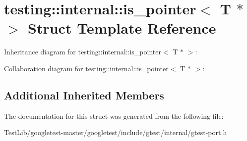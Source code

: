 \hypertarget{structtesting_1_1internal_1_1is__pointer_3_01T_01_5_01_4}{}\section{testing\+:\+:internal\+:\+:is\+\_\+pointer$<$ T $\ast$ $>$ Struct Template Reference}
\label{structtesting_1_1internal_1_1is__pointer_3_01T_01_5_01_4}


Inheritance diagram for testing\+:\+:internal\+:\+:is\+\_\+pointer$<$ T $\ast$ $>$\+:


Collaboration diagram for testing\+:\+:internal\+:\+:is\+\_\+pointer$<$ T $\ast$ $>$\+:
\subsection*{Additional Inherited Members}


The documentation for this struct was generated from the following file\+:\begin{DoxyCompactItemize}
\item 
Test\+Lib/googletest-\/master/googletest/include/gtest/internal/gtest-\/port.\+h\end{DoxyCompactItemize}
